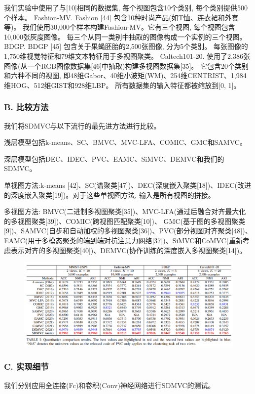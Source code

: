 \documentclass{article}
\begin{document}
我们实验中使用了与[10]相同的数据集, 每个视图包含10个类别, 每个类别提供500个样本。
Fashion-MV. Fashion [44] 包含10种时尚产品(如T恤、连衣裙和外套等)。
我们使用30,000个样本构建Fashion-MV。它有三个视图, 每个视图包含10,000张灰度图像。
每三个从同一类别中抽取的图像构成一个实例的三个视图。BDGP. BDGP [45] 包含关于果蝇胚胎的2,500张图像, 分为5个类别。
每张图像的1,750维视觉特征和79维文本特征用于多视图聚类。
Caltech101-20. 使用了2,386张图像(从一个RGB图像数据集[46]中抽取)构建多视图数据集[35]。
它包含20个类别和六种不同的视图, 即48维Gabor、40维小波矩(WM)、254维CENTRIST、1,984维HOG、512维GIST和928维LBP。
所有数据集的输入特征都被缩放到[0, 1]。

\subsubsection*{B. 比较方法}
我们将SDMVC与以下流行的最先进方法进行比较。

浅层模型包括k-means、SC、BMVC、MVC-LFA、COMIC、GMC和SAMVC。

深层模型包括DEC、IDEC、PVC、EAMC、SiMVC、DEMVC和我们的SDMVC。

单视图方法:k-means [42]、SC(谱聚类[47])、DEC(深度嵌入聚类[18])、IDEC(改进的深度嵌入聚类[19])。对于这些单视图方法, 输入是所有视图的拼接。

多视图方法: BMVC(二进制多视图聚类[35])、MVC-LFA(通过后融合对齐最大化的多视图聚类[39])、COMIC(跨视图匹配聚类[10])、
GMC(基于图的多视图聚类[9])、SAMVC(自步和自动加权的多视图聚类[36])、PVC(部分视图对齐聚类[48])、EAMC(用于多模态聚类的端到端对抗注意力网络[37])、SiMVC和CoMVC(重新考虑表示对齐的多视图聚类[40])、DEMVC(协作训练的深度嵌入多视图聚类[14])。

\begin{figure}[h]
    \centering
    \includegraphics[width=\linewidth]{./imgs/img3.png}
\end{figure}

\subsubsection*{C. 实现细节}
我们分别应用全连接(Fc)和卷积(Conv)神经网络进行SDMVC的测试。
\end{document}
